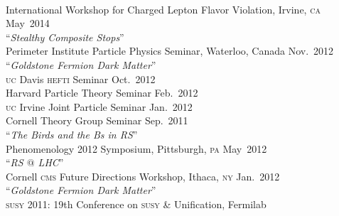 \documentclass[margin,line]{resume}
\newcommand{\mytalksep}{-.1mm}
\newcommand{\mytalkskip}{2mm}
\newcommand{\scap}[1]{\textsc{\MakeLowercase{#1}}}
\begin{document}
\begin{resume}
\vspace{\mytalksep}\\ 
International Workshop for Charged Lepton Flavor Violation, Irvine, \scap{CA}
\hfill %
May~2014\vspace{\mytalkskip}\\ 
%
%
%
``\emph{Stealthy Composite Stops}''
\vspace{\mytalksep}\\   
Perimeter Institute Particle Physics Seminar, Waterloo, Canada
\hfill %
Nov.~2012%
\vspace{\mytalkskip}\\
%
%
%
``\emph{Goldstone Fermion Dark Matter}''
\vspace{\mytalksep}\\   
\scap{UC} Davis \scap{HEFTI} Seminar
\hfill %
Oct.~2012\vspace{\mytalksep}\\   
%
Harvard Particle Theory Seminar%
\hfill %
Feb.~2012\vspace{\mytalksep}\\   
%
\scap{UC} Irvine Joint Particle Seminar
\hfill %
Jan.~2012\vspace{\mytalksep}\\   
%
Cornell Theory Group Seminar
\hfill %
Sep.~2011%
\vspace{\mytalkskip}\\
%
%
%
``\emph{The Birds and the Bs in RS}'' 
\vspace{\mytalksep}\\ 
Phenomenology 2012 Symposium, Pittsburgh, \scap{PA}
\hfill %
May~2012\vspace{\mytalkskip}\\ 
%
%
%
``\emph{RS $@$ LHC}'' 
\vspace{\mytalksep}\\ 
Cornell \scap{CMS} Future Directions Workshop, Ithaca, \scap{NY}
\hfill %
Jan.~2012\vspace{\mytalkskip}\\ 
%
%
%
``\emph{Goldstone Fermion Dark Matter}'' 
\vspace{\mytalksep}\\ 
\scap{SUSY} 2011: 19th Conference on \scap{SUSY} \& Unification, Fermilab
\hfill %

\end{resume}
\end{document}
